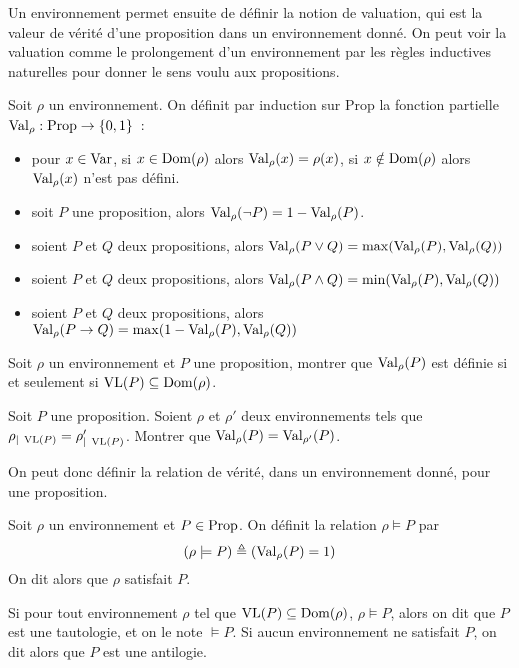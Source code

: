 Un environnement permet ensuite de définir la notion de valuation, qui est la
valeur de vérité d'une proposition dans un environnement donné. On peut voir
la valuation comme le prolongement d'un environnement par les règles inductives
naturelles pour donner le sens voulu aux propositions.

\begin{definition}[Valuation]
  Soit $\rho$ un environnement. On définit par induction sur $\mathrm{Prop}$
  la fonction partielle $\operatorname{Val}_\rho : \operatorname{Prop} \to \{0,1\}$~:
  \begin{itemize}
  \item pour $x\in \operatorname{Var}$, si $x\in \operatorname{Dom}(\rho)$ alors
    $\operatorname{Val}_\rho (x)= \rho(x)$, si $x\notin \operatorname{Dom}(\rho)$ alors
    $\operatorname{Val}_\rho (x)$ n'est pas défini.
  \item soit $P$ une proposition, alors
    $\operatorname{Val}_\rho(\lnot P) = 1 - \operatorname{Val}_\rho(P)$.
  \item soient $P$ et $Q$ deux propositions, alors
    $\operatorname{Val}_\rho(P\lor Q)=\max(\operatorname{Val}_\rho(P),\operatorname{Val}_\rho(Q))$
  \item soient $P$ et $Q$ deux propositions, alors
    $\operatorname{Val}_\rho(P\land Q)=\min(\operatorname{Val}_\rho(P),\operatorname{Val}_\rho(Q))$
  \item soient $P$ et $Q$ deux propositions, alors
    $\operatorname{Val}_\rho(P\to Q) = \max(1 - \operatorname{Val}_\rho(P),\operatorname{Val}_\rho(Q))$
  \end{itemize}
\end{definition}

\begin{exercise}
  Soit $\rho$ un environnement et $P$ une proposition, montrer que
  $\operatorname{Val}_\rho(P)$ est définie si et seulement si
  $\operatorname{VL}(P)\subseteq \operatorname{Dom}(\rho)$.
\end{exercise}

\begin{exercise}\label{exo.val.VL}
  Soit $P$ une proposition. Soient $\rho$ et $\rho'$ deux environnements tels
  que $\rho_{|\;\operatorname{VL}(P)}=\rho'_{|\;\operatorname{VL}(P)}$. Montrer que
  $\operatorname{Val}_\rho(P)=\operatorname{Val}_{\rho'}(P)$.
\end{exercise}

On peut donc définir la relation de vérité, dans un environnement donné, pour
une proposition.

\begin{definition}[Satisfaction]
  Soit $\rho$ un environnement et $P\in\operatorname{Prop}$. On définit la relation
  $\rho\models P$ par $$(\rho\models P) \triangleq (\operatorname{Val}_\rho(P) = 1)$$
  On dit alors que $\rho$ satisfait $P$.

  Si pour tout environnement $\rho$ tel que $\operatorname{VL}(P)\subseteq\operatorname{Dom}(\rho)$,
  $\rho\models P$, alors on dit que $P$ est une tautologie, et on le note
  $\models P$. Si aucun environnement ne satisfait $P$, on dit alors que $P$ est
  une antilogie.
\end{definition}

